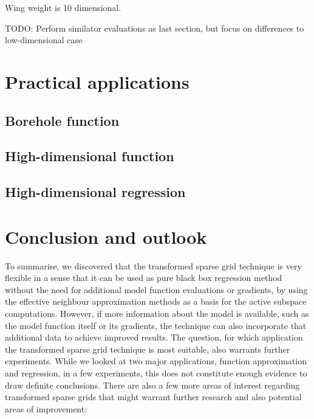 \documentclass[
  a4paper,  %
  twoside,  %
  bibliography=totoc,
  headsepline,
  cleardoublepage=empty,
  parskip=half,
  draft=false
]{scrbook}
\begin{document}
Wing weight is 10 dimensional.

TODO: Perform similator evaluations as last section, but focus on differences to low-dimensional case
\chapter{Practical applications}
\label{chap:c8}

\section{Borehole function}
\section{High-dimensional function}
\section{High-dimensional regression}

\chapter{Conclusion and outlook}
\label{chap:c9}

To summarise, we discovered that the transformed sparse grid technique is very flexible in a sense that it can be used as pure black box regression method without the need for additional model function evaluations or gradients, by using the effective neighbour approximation methods as a basis for the active subspace computations.
However, if more information about the model is available, such as the model function itself or its gradients, the technique can also incorporate that additional data to achieve improved results.
The question, for which application the transformed sparse grid technique is most suitable, also warrants further experiments.
While we looked at two major applications, function approximation and regression, in a few experiments, this does not constitute enough evidence to draw definite conclusions.
There are also a few more areas of interest regarding transformed sparse grids that might warrant further research and also potential areas of improvement:
\end{document}
